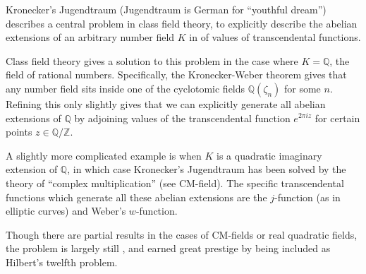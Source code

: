 \documentclass[12pt]{article}
\newcommand{\mb}{\mathbb}
\newcommand{\Z}{\mb{Z}}
\newcommand{\Q}{\mb{Q}}
\newcommand{\<}{\langle}
\renewcommand{\>}{\rangle}
\begin{document}
Kronecker's Jugendtraum (Jugendtraum is German for ``youthful dream'') describes a central problem in class field theory, to explicitly describe the abelian extensions of an arbitrary number field $K$ in  of values of transcendental functions.

Class field theory gives a  solution to this problem in the case where $K=\mathbb{Q}$, the field of rational numbers.  Specifically, the Kronecker-Weber theorem gives that any  number field sits inside one of the cyclotomic fields $\mathbb{Q}(\zeta_n)$ for some $n$.  Refining this only slightly gives that we can explicitly generate all abelian extensions of $\mathbb{Q}$ by adjoining values of the transcendental function $e^{2\pi iz}$ for certain points $z\in \Q/\Z$.

A slightly more complicated example is when $K$ is a quadratic imaginary extension of $\mathbb{Q}$, in which case Kronecker's Jugendtraum has been solved by the theory of ``complex multiplication'' (see CM-field). The specific transcendental functions which generate all these abelian extensions are the $j$-function (as in elliptic curves) and Weber's $w$-function.

Though there are partial results in the cases of CM-fields or real quadratic fields, the problem is largely still , and earned great prestige by being included as Hilbert's twelfth problem.
\end{document}
